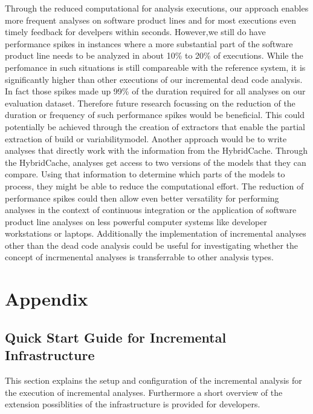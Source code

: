 \documentclass[a4paper]{article}
\begin{document}
Through the reduced computational for analysis executions, our approach enables more frequent analyses on software product lines and for most executions even timely feedback for develpers within seconds. However,we still do have performance spikes in instances where a more substantial part of the software product line needs to be analyzed in about 10\% to 20\% of executions. While the perfomance in such situations is still compareable with the reference system, it is significantly higher than other executions of our incremental dead code analysis. In fact those spikes made up 99\% of the duration required for all analyses on our evaluation dataset. Therefore future research focussing on the reduction of the duration or frequency of such performance spikes would be beneficial. This could potentially be achieved through the creation of extractors that enable the partial extraction of build or variabilitymodel. Another approach would be to write analyses that directly work with the information from the HybridCache. Through the HybridCache, analyses get access to two versions of the models that they can compare. Using that information to determine which parts of the models to process, they might be able to reduce the computational effort. The reduction of performance spikes could then allow even better versatility for performing analyses in the context of continuous integration or the application of software product line analyses on less powerful computer systems like developer workstations or laptops.
Additionally the implementation of incremental analyses other than the dead code analysis could be useful for investigating whether the concept of incrmenental analyses is transferrable to other analysis types.

\clearpage
\newpage



\clearpage
\newpage
\appendix
\section{Appendix}
\subsection{Quick Start Guide for Incremental Infrastructure}

This section explains the setup and configuration of the incremental analysis for the execution of incremental analyses. Furthermore a short overview of the extension possiblities of the infrastructure  is provided for developers.
\end{document}
